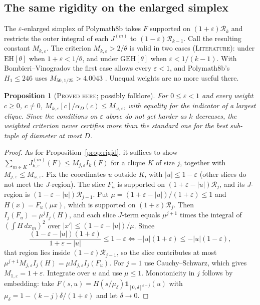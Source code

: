 \documentclass[11pt]{amsart}
\newtheorem{proposition}[theorem]{Proposition}
\theoremstyle{definition}
\theoremstyle{remark}
\newcommand{\lbl}[1]{\textup{\textsc{#1}}}
\newcommand{\R}{\mathcal{R}}
\begin{document}
\subsection*{The same rigidity on the enlarged simplex}
The $\varepsilon$-enlarged simplex of Polymath8b \cite[Thm.~3.12]{Pol14b}
takes $F$
supported on $(1+\varepsilon)\R_k$ and restricts the outer integral of each
$J^{(m)}$ to $(1-\varepsilon)\R_{k-1}$. Call the resulting constant
$M_{k,\varepsilon}$. The criterion $M_{k,\varepsilon}>2/\theta$ is valid in
two cases (\lbl{Literature}): under $\mathrm{EH}[\theta]$ when
$1+\varepsilon<1/\theta$, and under $\mathrm{GEH}[\theta]$ when
$\varepsilon<1/(k-1)$. With Bombieri--Vinogradov the first case allows every
$\varepsilon<1$, and Polymath8b's $H_1\le246$ uses $M_{50,1/25}>4.0043$
\cite[Thm.~3.13]{Pol14b}. Unequal weights are no more useful there.

\begin{proposition}[\lbl{Proved here}; possibly folklore]\label{prop:rigid-eps}
For $0\le\varepsilon<1$ and every weight $c\ge0$, $c\ne0$,
$M_{k,\varepsilon}[c]/\alpha_D(c)\le M_{\omega,\varepsilon}$, with equality
for the indicator of a largest clique. Since the conditions on $\varepsilon$
above do not get harder as $k$ decreases, the weighted criterion never
certifies more than the standard one for the best sub-tuple of diameter at
most $D$.
\end{proposition}

\begin{proof}
As for Proposition~\ref{prop:rigid}, it suffices to show
$\sum_{m\in K}J_{k,\varepsilon}^{(m)}(F)\le M_{j,\varepsilon}I_k(F)$ for a
clique $K$ of size $j$, together with $M_{j,\varepsilon}\le M_{\omega,\varepsilon}$.
Fix the coordinates $u$ outside $K$, with $|u|\le1-\varepsilon$ (other slices
do not meet the $J$-region). The slice $F_u$ is supported on
$(1+\varepsilon-|u|)\R_j$, and its $J$-region is
$(1-\varepsilon-|u|)\R_{j-1}$. Put $\mu=(1+\varepsilon-|u|)/(1+\varepsilon)\le1$
and $H(x)=F_u(\mu x)$, which is supported on $(1+\varepsilon)\R_j$. Then
$I_j(F_u)=\mu^jI_j(H)$, and each slice $J$-term equals $\mu^{j+1}$ times the
integral of $(\int H\,dx_m)^2$ over $|x'|\le(1-\varepsilon-|u|)/\mu$. Since
\[
\frac{(1-\varepsilon-|u|)(1+\varepsilon)}{1+\varepsilon-|u|}\le1-\varepsilon
\iff -|u|(1+\varepsilon)\le-|u|(1-\varepsilon),
\]
that region lies inside $(1-\varepsilon)\R_{j-1}$, so the slice contributes at
most $\mu^{j+1}M_{j,\varepsilon}I_j(H)=\mu M_{j,\varepsilon}I_j(F_u)$. For
$j=1$ use Cauchy--Schwarz, which gives $M_{1,\varepsilon}=1+\varepsilon$.
Integrate over $u$ and use $\mu\le1$. Monotonicity in $j$ follows by
embedding: take $F(s,u)=H(s/\mu_\delta)\mathbf 1_{[0,\delta]^{k-j}}(u)$ with
$\mu_\delta=1-(k-j)\delta/(1+\varepsilon)$ and let $\delta\to0$.
\end{proof}
\end{document}
